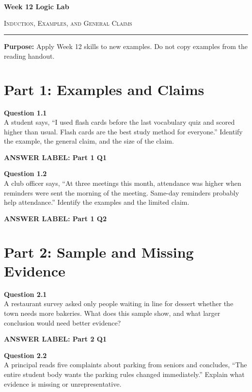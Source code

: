 \documentclass[12pt]{article}
\newcommand{\answerbox}[2]{%
\vspace{0.15em}
\noindent\textbf{#1}\par
\vspace{0.05em}
\noindent\fbox{%
\begin{minipage}[t][#2]{\dimexpr\textwidth-2\fboxsep-2\fboxrule}
\rule{\textwidth}{0pt}
\vspace{#2}
\end{minipage}
}\par
\vspace{0.25em}
}
\begin{document}
\begin{center}
{\LARGE\bfseries Week 12 Logic Lab}\par\vspace{0.05em}
{\large\scshape Induction, Examples, and General Claims}\par\vspace{0.1em}
\rule{0.78\textwidth}{0.5pt}\par\vspace{0.15em}
\end{center}

\noindent\textbf{Purpose:} Apply Week 12 skills to new examples. Do not copy examples from the reading handout.

\vspace{0.3em}

\section*{Part 1: Examples and Claims}

\textbf{Question 1.1}\\[-0.15em]
A student says, ``I used flash cards before the last vocabulary quiz and scored higher than usual. Flash cards are the best study method for everyone.'' Identify the example, the general claim, and the size of the claim.

\answerbox{ANSWER LABEL: Part 1 Q1}{2.35in}

\textbf{Question 1.2}\\[-0.15em]
A club officer says, ``At three meetings this month, attendance was higher when reminders were sent the morning of the meeting. Same-day reminders probably help attendance.'' Identify the examples and the limited claim.

\answerbox{ANSWER LABEL: Part 1 Q2}{2.35in}

\newpage

\section*{Part 2: Sample and Missing Evidence}

\textbf{Question 2.1}\\[-0.15em]
A restaurant survey asked only people waiting in line for dessert whether the town needs more bakeries. What does this sample show, and what larger conclusion would need better evidence?

\answerbox{ANSWER LABEL: Part 2 Q1}{2.55in}

\textbf{Question 2.2}\\[-0.15em]
A principal reads five complaints about parking from seniors and concludes, ``The entire student body wants the parking rules changed immediately.'' Explain what evidence is missing or unrepresentative.
\end{document}
